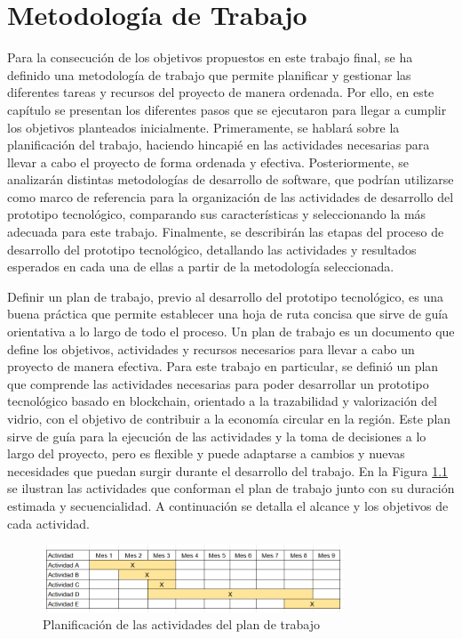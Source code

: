 \chapter[Metodología de Trabajo]{Metodología de Trabajo}
\label{cp:methodology}

\parindent0pt

Para la consecución de los objetivos propuestos en este trabajo final, se ha definido una metodología de trabajo que permite planificar y gestionar las diferentes tareas y recursos del proyecto de manera ordenada. Por ello, en este capítulo se presentan los diferentes pasos que se ejecutaron para llegar a cumplir los objetivos planteados inicialmente. Primeramente, se hablará sobre la planificación del trabajo, haciendo hincapié en las actividades necesarias para llevar a cabo el proyecto de forma ordenada y efectiva. Posteriormente, se analizarán distintas metodologías de desarrollo de software, que podrían utilizarse como marco de referencia para la organización de las actividades de desarrollo del prototipo tecnológico, comparando sus características y seleccionando la más adecuada para este trabajo. Finalmente, se describirán las etapas del proceso de desarrollo del prototipo tecnológico, detallando las actividades y resultados esperados en cada una de ellas a partir de la metodología seleccionada.

Definir un plan de trabajo, previo al desarrollo del prototipo tecnológico, es una buena práctica que permite establecer una hoja de ruta concisa que sirve de guía orientativa a lo largo de todo el proceso. Un plan de trabajo es un documento que define los objetivos, actividades y recursos necesarios para llevar a cabo un proyecto de manera efectiva. Para este trabajo en particular, se definió un plan que comprende las actividades necesarias para poder desarrollar un prototipo tecnológico basado en blockchain, orientado a la trazabilidad y valorización del vidrio, con el objetivo de contribuir a la economía circular en la región. Este plan sirve de guía para la ejecución de las actividades y la toma de decisiones a lo largo del proyecto, pero es flexible y puede adaptarse a cambios y nuevas necesidades que puedan surgir durante el desarrollo del trabajo. En la Figura \ref{fig:activities-plan} se ilustran las actividades que conforman el plan de trabajo junto con su duración estimada y secuencialidad. A continuación se detalla el alcance y los objetivos de cada actividad.

\begin{figure}[!htb]
    \centering
    \includegraphics[width=0.8\textwidth]{Figures/activities-plan.png}
    \caption{Planificación de las actividades del plan de trabajo}
    \label{fig:activities-plan}
\end{figure}

